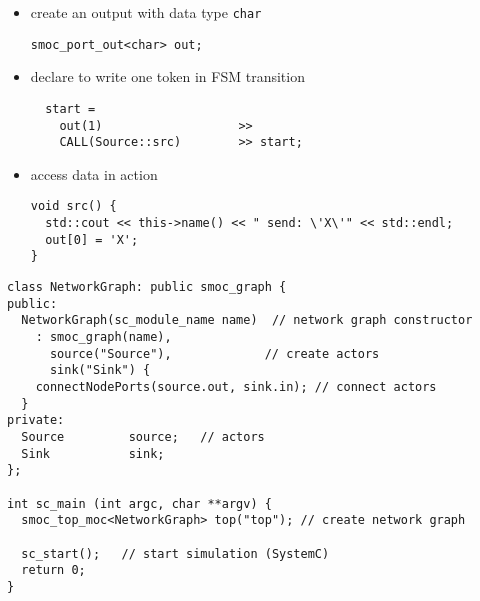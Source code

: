 \begin{frame}[fragile=singleslide]
\begin{itemize}
\item create an output with data type \lstinline!char!
\begin{lstlisting}
smoc_port_out<char> out;
\end{lstlisting}
\item declare to write one token in FSM transition
\begin{lstlisting}
  start = 
    out(1)                   >>
    CALL(Source::src)        >> start;
\end{lstlisting}
\item access data in action
\begin{lstlisting}
void src() {
  std::cout << this->name() << " send: \'X\'" << std::endl;
  out[0] = 'X';
}
\end{lstlisting}
\end{itemize}
\end{frame}




\begin{frame}[fragile=singleslide]
\begin{lstlisting}
class NetworkGraph: public smoc_graph {
public:
  NetworkGraph(sc_module_name name)  // network graph constructor
    : smoc_graph(name),
      source("Source"),             // create actors
      sink("Sink") {
    connectNodePorts(source.out, sink.in); // connect actors
  }
private:
  Source         source;   // actors
  Sink           sink;
};

int sc_main (int argc, char **argv) {
  smoc_top_moc<NetworkGraph> top("top"); // create network graph

  sc_start();   // start simulation (SystemC)
  return 0;
}
\end{lstlisting}
\end{frame}




